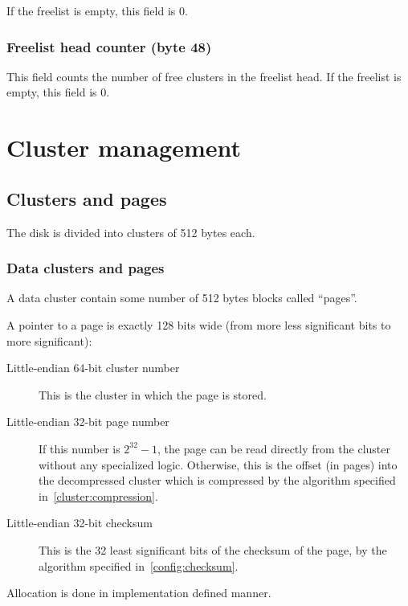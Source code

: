 \documentclass[11pt,a4paper]{report}
\newcommand{\clustersize}{512 }
\begin{document}
        If the freelist is empty, this field is 0.

        \subsection{Freelist head counter (byte 48)}
        \label{state:freelist_head_counter}
        This field counts the number of free clusters in the freelist head. If
        the freelist is empty, this field is 0.

    \chapter{Cluster management}

    \section{Clusters and pages}
        The disk is divided into clusters of \clustersize bytes each.

        \subsection{Data clusters and pages}
        \label{cluster:page}
        A data cluster contain some number of \clustersize bytes blocks called
        ``pages''.

        A pointer to a page is exactly 128 bits wide (from more less
        significant bits to more significant):

        \begin{description}
            \item [Little-endian 64-bit cluster number] This is the cluster in
                which the page is stored.
            \item [Little-endian 32-bit page number] If this number is $2^{32}
                - 1$, the page can be read directly from the cluster without
                any specialized logic.  Otherwise, this is the offset (in
                pages) into the decompressed cluster which is compressed by the
                algorithm specified in~\ref{cluster:compression}.
            \item [Little-endian 32-bit checksum] This is the 32 least
                significant bits of the checksum of the page, by the algorithm
                specified in~\ref{config:checksum}.
        \end{description}

        Allocation is done in implementation defined manner.
\end{document}
